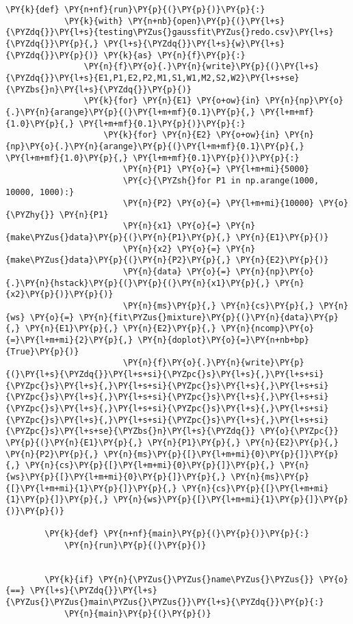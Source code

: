 \begin{Verbatim}[commandchars=\\\{\}, fontsize=\scriptsize]
        \PY{k}{def} \PY{n+nf}{run}\PY{p}{(}\PY{p}{)}\PY{p}{:}
            \PY{k}{with} \PY{n+nb}{open}\PY{p}{(}\PY{l+s}{\PYZdq{}}\PY{l+s}{testing\PYZus{}gaussfit\PYZus{}redo.csv}\PY{l+s}{\PYZdq{}}\PY{p}{,} \PY{l+s}{\PYZdq{}}\PY{l+s}{w}\PY{l+s}{\PYZdq{}}\PY{p}{)} \PY{k}{as} \PY{n}{f}\PY{p}{:}
                \PY{n}{f}\PY{o}{.}\PY{n}{write}\PY{p}{(}\PY{l+s}{\PYZdq{}}\PY{l+s}{E1,P1,E2,P2,M1,S1,W1,M2,S2,W2}\PY{l+s+se}{\PYZbs{}n}\PY{l+s}{\PYZdq{}}\PY{p}{)}
                \PY{k}{for} \PY{n}{E1} \PY{o+ow}{in} \PY{n}{np}\PY{o}{.}\PY{n}{arange}\PY{p}{(}\PY{l+m+mf}{0.1}\PY{p}{,} \PY{l+m+mf}{1.0}\PY{p}{,} \PY{l+m+mf}{0.1}\PY{p}{)}\PY{p}{:}
                    \PY{k}{for} \PY{n}{E2} \PY{o+ow}{in} \PY{n}{np}\PY{o}{.}\PY{n}{arange}\PY{p}{(}\PY{l+m+mf}{0.1}\PY{p}{,} \PY{l+m+mf}{1.0}\PY{p}{,} \PY{l+m+mf}{0.1}\PY{p}{)}\PY{p}{:}
                        \PY{n}{P1} \PY{o}{=} \PY{l+m+mi}{5000}
                        \PY{c}{\PYZsh{}for P1 in np.arange(1000, 10000, 1000):}
                        \PY{n}{P2} \PY{o}{=} \PY{l+m+mi}{10000} \PY{o}{\PYZhy{}} \PY{n}{P1} 
                        \PY{n}{x1} \PY{o}{=} \PY{n}{make\PYZus{}data}\PY{p}{(}\PY{n}{P1}\PY{p}{,} \PY{n}{E1}\PY{p}{)}
                        \PY{n}{x2} \PY{o}{=} \PY{n}{make\PYZus{}data}\PY{p}{(}\PY{n}{P2}\PY{p}{,} \PY{n}{E2}\PY{p}{)}
                        \PY{n}{data} \PY{o}{=} \PY{n}{np}\PY{o}{.}\PY{n}{hstack}\PY{p}{(}\PY{p}{(}\PY{n}{x1}\PY{p}{,} \PY{n}{x2}\PY{p}{)}\PY{p}{)}
                        \PY{n}{ms}\PY{p}{,} \PY{n}{cs}\PY{p}{,} \PY{n}{ws} \PY{o}{=} \PY{n}{fit\PYZus{}mixture}\PY{p}{(}\PY{n}{data}\PY{p}{,} \PY{n}{E1}\PY{p}{,} \PY{n}{E2}\PY{p}{,} \PY{n}{ncomp}\PY{o}{=}\PY{l+m+mi}{2}\PY{p}{,} \PY{n}{doplot}\PY{o}{=}\PY{n+nb+bp}{True}\PY{p}{)}
                        \PY{n}{f}\PY{o}{.}\PY{n}{write}\PY{p}{(}\PY{l+s}{\PYZdq{}}\PY{l+s+si}{\PYZpc{}s}\PY{l+s}{,}\PY{l+s+si}{\PYZpc{}s}\PY{l+s}{,}\PY{l+s+si}{\PYZpc{}s}\PY{l+s}{,}\PY{l+s+si}{\PYZpc{}s}\PY{l+s}{,}\PY{l+s+si}{\PYZpc{}s}\PY{l+s}{,}\PY{l+s+si}{\PYZpc{}s}\PY{l+s}{,}\PY{l+s+si}{\PYZpc{}s}\PY{l+s}{,}\PY{l+s+si}{\PYZpc{}s}\PY{l+s}{,}\PY{l+s+si}{\PYZpc{}s}\PY{l+s}{,}\PY{l+s+si}{\PYZpc{}s}\PY{l+s+se}{\PYZbs{}n}\PY{l+s}{\PYZdq{}} \PY{o}{\PYZpc{}} \PY{p}{(}\PY{n}{E1}\PY{p}{,} \PY{n}{P1}\PY{p}{,} \PY{n}{E2}\PY{p}{,} \PY{n}{P2}\PY{p}{,} \PY{n}{ms}\PY{p}{[}\PY{l+m+mi}{0}\PY{p}{]}\PY{p}{,} \PY{n}{cs}\PY{p}{[}\PY{l+m+mi}{0}\PY{p}{]}\PY{p}{,} \PY{n}{ws}\PY{p}{[}\PY{l+m+mi}{0}\PY{p}{]}\PY{p}{,} \PY{n}{ms}\PY{p}{[}\PY{l+m+mi}{1}\PY{p}{]}\PY{p}{,} \PY{n}{cs}\PY{p}{[}\PY{l+m+mi}{1}\PY{p}{]}\PY{p}{,} \PY{n}{ws}\PY{p}{[}\PY{l+m+mi}{1}\PY{p}{]}\PY{p}{)}\PY{p}{)}
        
        \PY{k}{def} \PY{n+nf}{main}\PY{p}{(}\PY{p}{)}\PY{p}{:}
            \PY{n}{run}\PY{p}{(}\PY{p}{)}
            
        
        \PY{k}{if} \PY{n}{\PYZus{}\PYZus{}name\PYZus{}\PYZus{}} \PY{o}{==} \PY{l+s}{\PYZdq{}}\PY{l+s}{\PYZus{}\PYZus{}main\PYZus{}\PYZus{}}\PY{l+s}{\PYZdq{}}\PY{p}{:}
            \PY{n}{main}\PY{p}{(}\PY{p}{)}
\end{Verbatim}

